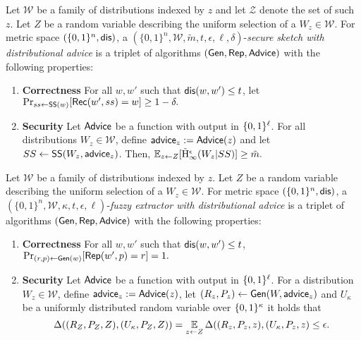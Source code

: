 \begin{definition}
\label{def:ss distributional}
Let $\mathcal{W}$ be a family of distributions indexed by $z$ and let $\mathcal{Z}$ denote the set of such $z$.  Let $Z$ be a random variable describing the uniform selection of a $W_z \in \mathcal{W}$.
For metric space $(\{0,1\}^n, \mathsf{dis})$, a $(\{0,1\}^n, \mathcal{W}, \tilde{m}, t, \epsilon, \ell, \delta)$-\emph{secure sketch with distributional advice} is a triplet of algorithms $({\mathsf{Gen}}, {\mathsf{Rep}}, {\mathsf{Advice}})$ with the following properties:
\begin{enumerate} 
\itemsep0em
\item \textbf{Correctness} For all $w, w'$ such that $\mathsf{dis}(w, w')\le t$, let $\Pr_{ss \leftarrow {\ensuremath{\mathsf{SS}}}(w)}[{\mathsf{Rec}}(w', ss) = w]\ge 1-\delta.$
\item \textbf{Security} Let ${\mathsf{Advice}}$ be a function with output in $\{0, 1\}^\ell$.  For all distributions $W_z \in \mathcal{W}$, define ${\mathsf{advice}}_z:= {\mathsf{Advice}}(z)$ and let $SS \leftarrow {\ensuremath{\mathsf{SS}}}(W_z, {\mathsf{advice}}_z)$. Then,
$
\operatorname*{\mathbb{E}}_{z\leftarrow Z} [\tilde{\mathrm{H}}_\infty^\epsilon(W_z| SS)] \ge \tilde{m}.
$
\end{enumerate}
\end{definition}


\begin{definition}
\label{def:fe distributional}
Let $\mathcal{W}$ be a family of distributions indexed by $z$.  Let $Z$ be a random variable describing the uniform selection of a $W_z\in\mathcal{W}$.
For metric space $(\{0,1\}^n, \mathsf{dis})$, a $(\{0,1\}^n, \mathcal{W}, \kappa, t, \epsilon, \ell)$-\emph{fuzzy extractor with distributional advice} is a triplet of algorithms $({\mathsf{Gen}}, {\mathsf{Rep}}, {\mathsf{Advice}})$ with the following properties:
\begin{enumerate} 
\itemsep0em
\item \textbf{Correctness} For all $w, w'$ such that $\mathsf{dis}(w, w')\le t$, $\Pr_{(r, p) \leftarrow {\ensuremath{\mathsf{Gen}}}(w)}[{\mathsf{Rep}}(w', p) = r]=1.$
\item \textbf{Security} Let ${\mathsf{Advice}}$ be a function with output in $\{0, 1\}^\ell$.  For a distribution $W_z \in \mathcal{W}$, define ${\mathsf{advice}}_z:= {\mathsf{Advice}}(z)$, let $(R_z, P_z) \leftarrow {\ensuremath{\mathsf{Gen}}}(W, {\mathsf{advice}}_z)$ and $U_\kappa$ be a uniformly distributed random variable over $\{0, 1\}^\kappa$ it holds that \[
\Delta((R_Z, P_Z, Z), (U_\kappa, P_Z, Z)) = \operatorname*{\mathbb{E}}_{z\leftarrow Z} \Delta((R_z, P_z, z), (U_\kappa, P_z, z)\le \epsilon.\]
\end{enumerate}
\end{definition}

